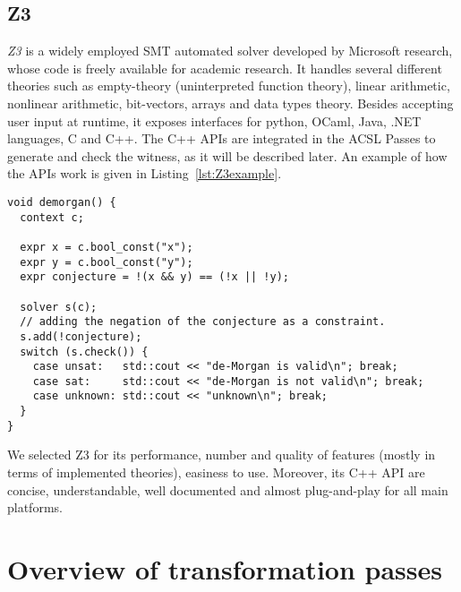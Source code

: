 \subsection{Z3}
\label{sub:z3}
\emph{Z3} is a widely employed SMT automated solver developed by Microsoft research, whose code is freely available for academic research. It handles several different theories such as empty-theory (uninterpreted function theory), linear arithmetic, nonlinear arithmetic, bit-vectors, arrays and data types theory. Besides accepting user input at runtime, it exposes interfaces for python, OCaml, Java, .NET languages, C and C++. The C++ APIs are integrated in the ACSL Passes to generate and check the witness, as it will be described later. An example of how the APIs work is given in Listing~\ref{lst:Z3example}.

\begin{lstlisting}[caption={Example of an SMT problem with Z3 API for C++}, label={lst:Z3example}, float =hb]
void demorgan() {
  context c;

  expr x = c.bool_const("x");
  expr y = c.bool_const("y");
  expr conjecture = !(x && y) == (!x || !y);

  solver s(c);
  // adding the negation of the conjecture as a constraint.
  s.add(!conjecture);
  switch (s.check()) {
    case unsat:   std::cout << "de-Morgan is valid\n"; break;
    case sat:     std::cout << "de-Morgan is not valid\n"; break;
    case unknown: std::cout << "unknown\n"; break;
  }
}
\end{lstlisting}

We selected Z3 for its performance, number and quality of features (mostly in terms of implemented theories), easiness to use. Moreover, its C++ API are concise, understandable, well documented and almost plug-and-play for all main platforms.

\section{Overview of transformation passes}
\label{sec:overview_of_transformation_passes}

